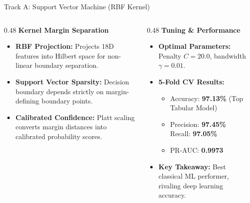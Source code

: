 \documentclass[aspectratio=169,11pt]{beamer}
\begin{document}
\begin{frame}{Track A: Support Vector Machine (RBF Kernel)}
  \vspace*{0.12cm}
  \begin{columns}[T,onlytextwidth]
    \begin{column}{0.48\textwidth}
      \textbf{\small\color{navy} Kernel Margin Separation}
      \vspace*{0.08cm}
      \begin{itemize}\setlength{\itemsep}{0.25em}\footnotesize
        \item \textbf{RBF Projection:} Projects 18D features into Hilbert space for non-linear boundary separation.
        \item \textbf{Support Vector Sparsity:} Decision boundary depends strictly on margin-defining boundary points.
        \item \textbf{Calibrated Confidence:} Platt scaling converts margin distances into calibrated probability scores.
      \end{itemize}
    \end{column}
    \hfill
    \begin{column}{0.48\textwidth}
      \textbf{\small\color{blastred} Tuning \& Performance}
      \vspace*{0.08cm}
      \begin{itemize}\setlength{\itemsep}{0.25em}\footnotesize
        \item \textbf{Optimal Parameters:} Penalty $C = 20.0$, bandwidth $\gamma = 0.01$.
        \item \textbf{5-Fold CV Results:}
          \begin{itemize}\scriptsize
            \item Accuracy: \textbf{\color{blastred} 97.13\%} (Top Tabular Model)
            \item Precision: \textbf{97.45\%} $\quad$ Recall: \textbf{97.05\%}
            \item PR-AUC: \textbf{\color{blastred} 0.9973}
          \end{itemize}
        \item \textbf{Key Takeaway:} Best classical ML performer, rivaling deep learning accuracy.
      \end{itemize}
    \end{column}
  \end{columns}
\end{frame}
\end{document}
